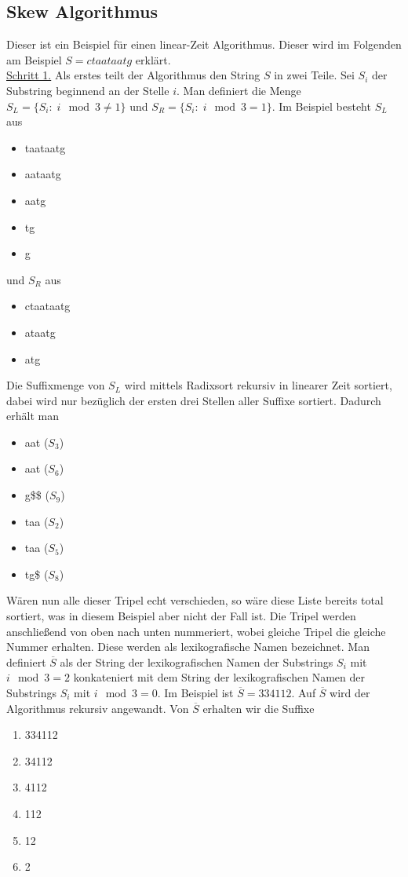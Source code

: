 \documentclass[a4paper, 12pt]{article}
\theoremstyle{plain}
\theoremstyle{definition}
\theoremstyle{lemma}
\theoremstyle{remark}
\theoremstyle{corollary}
\theoremstyle{example}
\begin{document}
	\subsection{Skew Algorithmus}
	Dieser ist ein Beispiel für einen linear-Zeit Algorithmus. Dieser wird im Folgenden am Beispiel $S = ctaataatg$ erklärt.\\
	\underline{Schritt 1.} Als erstes teilt der Algorithmus den String $S$ in zwei Teile. Sei $S_i$ der Substring beginnend an der Stelle $i$. Man definiert die Menge $S_L = \{S_i: \; i \mod 3 \neq 1\}$ und $S_R = \{S_i: \; i \mod 3 = 1\}$. Im Beispiel besteht $S_L$ aus 
	\begin{itemize}
		\item taataatg
		\item aataatg
		\item aatg
		\item tg
		\item g
	\end{itemize} und $S_R$ aus 
	\begin{itemize}
		\item ctaataatg
		\item ataatg
		\item atg
	\end{itemize}
	Die Suffixmenge von $S_L$ wird mittels Radixsort rekursiv in linearer Zeit sortiert, dabei wird nur bezüglich der ersten drei Stellen aller Suffixe sortiert. Dadurch erhält man
	\begin{itemize}
		\item aat ($S_3$)
		\item aat ($S_6$)
		\item g\$\$ ($S_9$)
		\item taa ($S_2$)
		\item taa ($S_5$)
		\item tg\$ ($S_8$)
	\end{itemize}
	Wären nun alle dieser Tripel echt verschieden, so wäre diese Liste bereits total sortiert, was in diesem Beispiel aber nicht der Fall ist. Die Tripel werden anschließend von oben nach unten nummeriert, wobei gleiche Tripel die gleiche Nummer erhalten. Diese werden als lexikografische Namen bezeichnet. Man definiert $\overline{S}$ als der String der lexikografischen Namen der Substrings $S_i$ mit $i \mod 3 = 2$ konkateniert mit dem String der lexikografischen Namen der Substrings $S_i$ mit $i \mod 3 = 0$. Im Beispiel ist $\overline{S} = 334112$. Auf $\overline{S}$ wird der Algorithmus rekursiv angewandt. Von $\overline{S}$ erhalten wir die Suffixe \begin{enumerate}
		\item 334112
		\item 34112
		\item 4112
		\item 112
		\item 12
		\item 2
	\end{enumerate}
\end{document}
